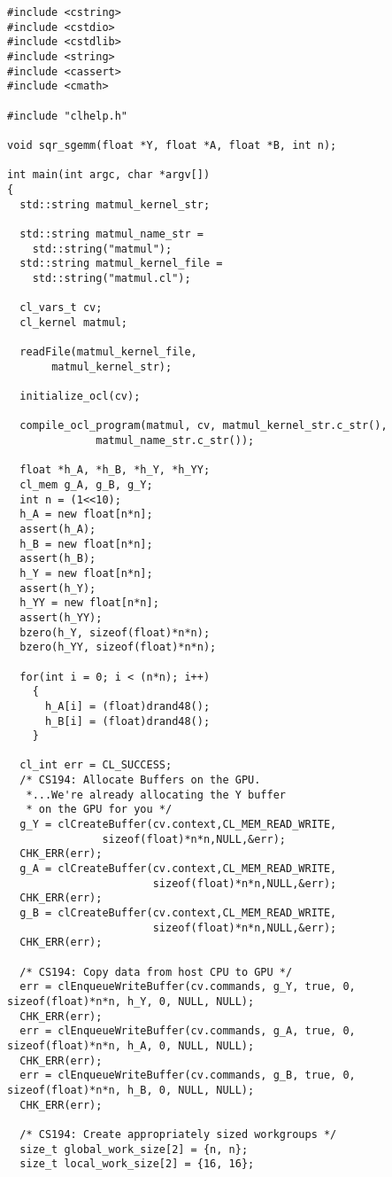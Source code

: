 \documentclass[11pt,letter]{article}
\begin{document}
\begin{lstlisting}[label=some-code,caption=matmul.cpp]
#include <cstring>
#include <cstdio>
#include <cstdlib>
#include <string>
#include <cassert>
#include <cmath>

#include "clhelp.h"

void sqr_sgemm(float *Y, float *A, float *B, int n);

int main(int argc, char *argv[])
{
  std::string matmul_kernel_str;
 
  std::string matmul_name_str = 
    std::string("matmul");
  std::string matmul_kernel_file = 
    std::string("matmul.cl");

  cl_vars_t cv; 
  cl_kernel matmul;
  
  readFile(matmul_kernel_file,
	   matmul_kernel_str);
  
  initialize_ocl(cv);
  
  compile_ocl_program(matmul, cv, matmul_kernel_str.c_str(),
		      matmul_name_str.c_str());
  
  float *h_A, *h_B, *h_Y, *h_YY;
  cl_mem g_A, g_B, g_Y;
  int n = (1<<10);
  h_A = new float[n*n];
  assert(h_A);
  h_B = new float[n*n];
  assert(h_B);
  h_Y = new float[n*n];
  assert(h_Y);
  h_YY = new float[n*n];
  assert(h_YY);
  bzero(h_Y, sizeof(float)*n*n);
  bzero(h_YY, sizeof(float)*n*n);
  
  for(int i = 0; i < (n*n); i++)
    {
      h_A[i] = (float)drand48();
      h_B[i] = (float)drand48();
    }

  cl_int err = CL_SUCCESS;
  /* CS194: Allocate Buffers on the GPU.
   *...We're already allocating the Y buffer
   * on the GPU for you */
  g_Y = clCreateBuffer(cv.context,CL_MEM_READ_WRITE,
		       sizeof(float)*n*n,NULL,&err);
  CHK_ERR(err);
  g_A = clCreateBuffer(cv.context,CL_MEM_READ_WRITE,
                       sizeof(float)*n*n,NULL,&err);
  CHK_ERR(err);
  g_B = clCreateBuffer(cv.context,CL_MEM_READ_WRITE,
                       sizeof(float)*n*n,NULL,&err);
  CHK_ERR(err);

  /* CS194: Copy data from host CPU to GPU */
  err = clEnqueueWriteBuffer(cv.commands, g_Y, true, 0, sizeof(float)*n*n, h_Y, 0, NULL, NULL);
  CHK_ERR(err);
  err = clEnqueueWriteBuffer(cv.commands, g_A, true, 0, sizeof(float)*n*n, h_A, 0, NULL, NULL);
  CHK_ERR(err);
  err = clEnqueueWriteBuffer(cv.commands, g_B, true, 0, sizeof(float)*n*n, h_B, 0, NULL, NULL);
  CHK_ERR(err);

  /* CS194: Create appropriately sized workgroups */
  size_t global_work_size[2] = {n, n};
  size_t local_work_size[2] = {16, 16};
  

\end{lstlisting}
\end{document}
